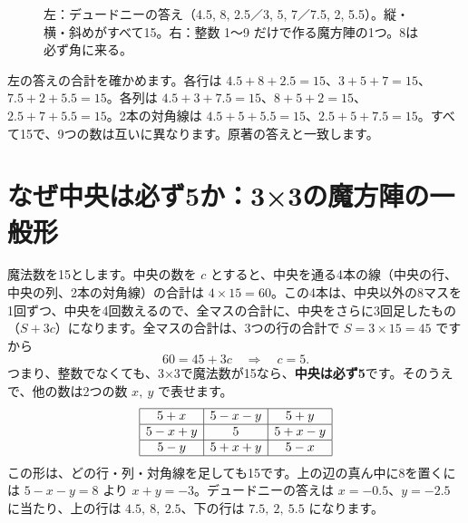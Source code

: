 \documentclass[a4paper,11pt,openany]{ltjsbook}
\begin{document}
\begin{figure}[htbp]
\centering
{}
\caption{左：デュードニーの答え（4.5, 8, 2.5／3, 5, 7／7.5, 2, 5.5）。縦・横・斜めがすべて15。右：整数 1〜9 だけで作る魔方陣の1つ。8は必ず角に来る。}
\end{figure}

左の答えの合計を確かめます。各行は $4.5+8+2.5=15$、$3+5+7=15$、$7.5+2+5.5=15$。各列は $4.5+3+7.5=15$、$8+5+2=15$、$2.5+7+5.5=15$。2本の対角線は $4.5+5+5.5=15$、$2.5+5+7.5=15$。すべて15で、9つの数は互いに異なります。原著の答えと一致します。

\section{なぜ中央は必ず5か：3×3の魔方陣の一般形}

魔法数を15とします。中央の数を $c$ とすると、中央を通る4本の線（中央の行、中央の列、2本の対角線）の合計は $4\times15=60$。この4本は、中央以外の8マスを1回ずつ、中央を4回数えるので、全マスの合計に、中央をさらに3回足したもの（$S+3c$）になります。全マスの合計は、3つの行の合計で $S=3\times15=45$ ですから
\[
60=45+3c\quad\Longrightarrow\quad c=5 .
\]
つまり、整数でなくても、3×3で魔法数が15なら、\textbf{中央は必ず5}です。そのうえで、他の数は2つの数 $x,\ y$ で表せます。
\[
\begin{array}{|c|c|c|}\hline
5+x & 5-x-y & 5+y\\\hline
5-x+y & 5 & 5+x-y\\\hline
5-y & 5+x+y & 5-x\\\hline
\end{array}
\]
この形は、どの行・列・対角線を足しても15です。上の辺の真ん中に8を置くには $5-x-y=8$ より $x+y=-3$。デュードニーの答えは $x=-0.5$、$y=-2.5$ に当たり、上の行は $4.5,\ 8,\ 2.5$、下の行は $7.5,\ 2,\ 5.5$ になります。
\end{document}
